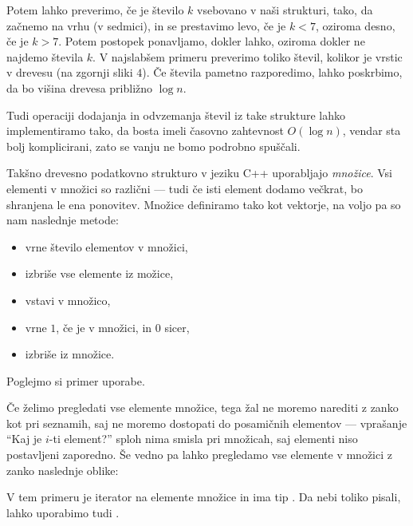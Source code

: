 Potem lahko preverimo, če je število $k$ vsebovano v naši strukturi, tako, da
začnemo na vrhu (v sedmici), in se prestavimo levo, če je $k < 7$, oziroma
desno, če je $k > 7$.
Potem postopek ponavljamo, dokler lahko, oziroma dokler ne najdemo števila $k$.
V najslabšem primeru preverimo toliko števil, kolikor je vrstic v drevesu (na
zgornji sliki $4$).
Če števila pametno razporedimo, lahko poskrbimo, da bo višina drevesa približno
$\log n$.

Tudi operaciji dodajanja in odvzemanja števil iz take strukture lahko
implementiramo tako, da bosta imeli časovno zahtevnost $O(\log n)$, vendar sta
bolj komplicirani, zato se vanju ne bomo podrobno spuščali.

Takšno drevesno podatkovno strukturo v jeziku C++ uporabljajo \emph{množice}.
Vsi elementi v množici so različni --- tudi če isti element dodamo večkrat, bo
shranjena le ena ponovitev.
Množice definiramo tako kot vektorje, na voljo pa so nam naslednje metode:
\begin{itemize}
\item {} vrne število elementov v množici,
\item {} izbriše vse elemente iz možice,
\item {} vstavi  v množico,
\item {} vrne $1$, če je  v množici, in $0$ sicer,
\item {} izbriše  iz množice.
\end{itemize}
Poglejmo si primer uporabe.


Če želimo pregledati vse elemente množice, tega žal ne moremo narediti z zanko
kot pri seznamih, saj ne moremo dostopati do posamičnih elementov --- vprašanje
\enquote{Kaj je $i$-ti element?} sploh nima smisla pri množicah, saj elementi
niso postavljeni zaporedno.
Še vedno pa lahko pregledamo vse elemente v množici z zanko naslednje oblike:


V tem primeru je  iterator na elemente množice in ima tip
.
Da nebi toliko pisali, lahko uporabimo tudi .





